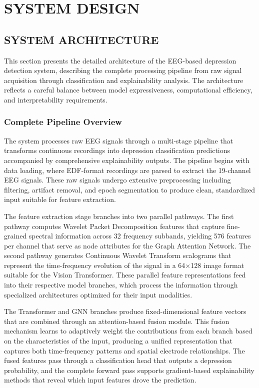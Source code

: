 
\chapter{SYSTEM DESIGN}

\section{SYSTEM ARCHITECTURE}

This section presents the detailed architecture of the EEG-based depression detection system, describing the complete processing pipeline from raw signal acquisition through classification and explainability analysis. The architecture reflects a careful balance between model expressiveness, computational efficiency, and interpretability requirements.

\subsection{Complete Pipeline Overview}

The system processes raw EEG signals through a multi-stage pipeline that transforms continuous recordings into depression classification predictions accompanied by comprehensive explainability outputs. The pipeline begins with data loading, where EDF-format recordings are parsed to extract the 19-channel EEG signals. These raw signals undergo extensive preprocessing including filtering, artifact removal, and epoch segmentation to produce clean, standardized input suitable for feature extraction.

The feature extraction stage branches into two parallel pathways. The first pathway computes Wavelet Packet Decomposition features that capture fine-grained spectral information across 32 frequency subbands, yielding 576 features per channel that serve as node attributes for the Graph Attention Network. The second pathway generates Continuous Wavelet Transform scalograms that represent the time-frequency evolution of the signal in a 64×128 image format suitable for the Vision Transformer. These parallel feature representations feed into their respective model branches, which process the information through specialized architectures optimized for their input modalities.

The Transformer and GNN branches produce fixed-dimensional feature vectors that are combined through an attention-based fusion module. This fusion mechanism learns to adaptively weight the contributions from each branch based on the characteristics of the input, producing a unified representation that captures both time-frequency patterns and spatial electrode relationships. The fused features pass through a classification head that outputs a depression probability, and the complete forward pass supports gradient-based explainability methods that reveal which input features drove the prediction.

